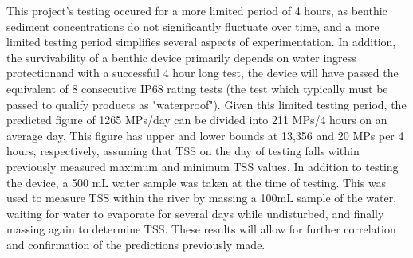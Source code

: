 \documentclass[fleqn,10pt]{SelfArx} %
\begin{document}
	This project's testing occured for a more limited period of 4 hours, as \gls{benthic} sediment concentrations do not significantly fluctuate over time, and a more limited testing period simplifies several aspects of experimentation. In addition, the survivability of a \gls{benthic} device primarily depends on water ingress protection\textemdash and with a successful 4 hour long test, the device will have passed the equivalent of 8 consecutive IP68 rating tests (the test which typically must be passed to qualify products as "waterproof"). Given this limited testing period, the predicted figure of 1265 MPs/day can be divided into 211 MPs/4 hours on an average day. This figure has upper and lower bounds at 13,356 and 20 MPs per 4 hours, respectively, assuming that TSS on the day of testing falls within previously measured maximum and minimum TSS values.
	\linebreak
	In addition to testing the device, a 500 mL water sample was taken at the time of testing. This was used to measure TSS within the river by massing a 100mL sample of the water, waiting for water to evaporate for several days while undisturbed, and finally massing again to determine TSS. These results will allow for further correlation and confirmation of the predictions previously made.
\end{document}
